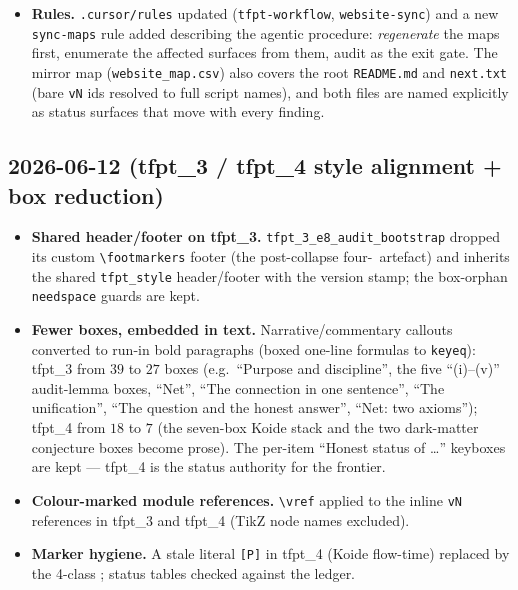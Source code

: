 \begin{itemize}
  \texttt{tfpt\_2} sections (hexagonal resolvent; master cover), and two short
  \texttt{\textbackslash veri\{v19\}} citations were expanded to the full script name.
  \vref{v91} (spine tetrahedron) had no paper section at all --- it is now integrated:
  a keybox in \texttt{tfpt\_3} (``Three views of one spine'': anchor closure, edge/face
  products, volume $120$, $K_6$ negative control, the tautology/sub-grammar caveats) and
  a closing note in the \texttt{tfpt\_1} Spine Quotient Lemma; the
  \texttt{ARCH.SPINE.01} ledger location is corrected to \texttt{tfpt\_1;tfpt\_3} and the
  baseline exception list is empty again.
\item \textbf{Rules.} \texttt{.cursor/rules} updated (\texttt{tfpt-workflow},
  \texttt{website-sync}) and a new \texttt{sync-maps} rule added describing the agentic
  procedure: \emph{regenerate} the maps first, enumerate the affected surfaces from
  them, audit as the exit gate. The mirror map (\texttt{website\_map.csv}) also covers
  the root \texttt{README.md} and \texttt{next.txt} (bare \texttt{vN} ids resolved to
  full script names), and both files are named explicitly as status surfaces that move
  with every finding.
\end{itemize}

\subsection*{2026-06-12 (tfpt\_3 / tfpt\_4 style alignment + box reduction)}
\begin{itemize}
\item \textbf{Shared header/footer on tfpt\_3.} \texttt{tfpt\_3\_e8\_audit\_bootstrap} dropped its custom
  \texttt{\textbackslash footmarkers} footer (the post-collapse four-\mE\ artefact) and inherits the
  shared \texttt{tfpt\_style} header/footer with the version stamp; the box-orphan \texttt{needspace}
  guards are kept.
\item \textbf{Fewer boxes, embedded in text.} Narrative/commentary callouts converted to run-in bold
  paragraphs (boxed one-line formulas to \texttt{keyeq}): tfpt\_3 from $39$ to $27$ boxes (e.g.\
  ``Purpose and discipline'', the five ``(i)--(v)'' audit-lemma boxes, ``Net'', ``The connection in one
  sentence'', ``The unification'', ``The question and the honest answer'', ``Net: two axioms''); tfpt\_4
  from $18$ to $7$ (the seven-box Koide stack and the two dark-matter conjecture boxes become prose). The
  per-item ``Honest status of \ldots'' keyboxes are kept --- tfpt\_4 is the status authority for the
  frontier.
\item \textbf{Colour-marked module references.} \texttt{\textbackslash vref} applied to the inline
  \texttt{vN} references in tfpt\_3 and tfpt\_4 (TikZ node names excluded).
\item \textbf{Marker hygiene.} A stale literal \texttt{[P]} in tfpt\_4 (Koide flow-time) replaced by the
  4-class \mC; status tables checked against the ledger.
\end{itemize}

